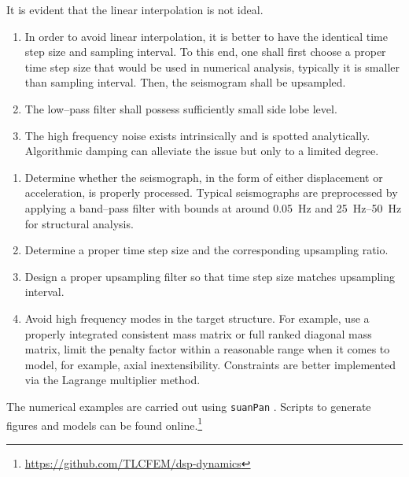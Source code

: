 It is evident that the linear interpolation is not ideal.
\begin{enumerate}
\item In order to avoid linear interpolation, it is better to have the identical time step size and sampling interval. To this end, one shall first choose a proper time step size that would be used in numerical analysis, typically it is smaller than sampling interval. Then, the seismogram shall be upsampled.
\item The low--pass filter shall possess sufficiently small side lobe level.
\item The high frequency noise exists intrinsically and is spotted analytically. Algorithmic damping can alleviate the issue but only to a limited degree.
\end{enumerate}

\begin{enumerate}
\item Determine whether the seismograph, in the form of either displacement or acceleration, is properly processed. Typical seismographs are preprocessed by applying a band--pass filter with bounds at around \SI{0.05}{\hertz} and \SIrange{25}{50}{\hertz} for structural analysis.
\item Determine a proper time step size and the corresponding upsampling ratio.
\item Design a proper upsampling filter so that time step size matches upsampling interval.
\item Avoid high frequency modes in the target structure. For example, use a properly integrated consistent mass matrix or full ranked diagonal mass matrix, limit the penalty factor within a reasonable range when it comes to model, for example, axial inextensibility. Constraints are better implemented via the Lagrange multiplier method.
\end{enumerate}

The numerical examples are carried out using \texttt{suanPan} \citep{Chang2022}. Scripts to generate figures and models can be found online.\footnote{\url{https://github.com/TLCFEM/dsp-dynamics}}